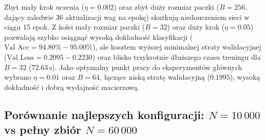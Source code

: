 \documentclass{article}
\begin{document}
\begin{table}[H]
\centering
\caption{Wpływ współczynnika uczenia (\texttt{learning\_rate}) oraz rozmiaru paczki (\texttt{batch\_size}) dla sieci \texttt{784-128-64-10} na podzbiorze $N = 10\,000$ ($15$ epok, \texttt{ReLU + CCE}).}
\label{tab:hyperparams_10k}
\vspace{0.2cm}
\end{table}

Zbyt mały krok uczenia ($\eta = 0.002$) oraz zbyt duży rozmiar paczki ($B = 256$, dający zaledwie 36 aktualizacji wag na epokę) skutkują niedouczeniem sieci w ciągu 15 epok. Z kolei mały rozmiar paczki ($B = 32$) oraz duży krok ($\eta = 0.05$) pozwalają szybko osiągnąć wysoką dokładność klasyfikacji ($\text{Val Acc} = 94.80\% - 95.00\%$), ale kosztem wyższej minimalnej straty walidacyjnej ($\text{Val Loss} = 0.2095 - 0.2230$) oraz blisko trzykrotnie dłuższego czasu treningu dla $B = 32$ ($72.63\,\text{s}$). Jako optymalny punkt pracy do eksperymentów głównych wybrano $\eta = 0.01$ oraz $B = 64$, łączące niską stratę walidacyjną ($0.1995$), wysoką dokładność i dobrą wydajność macierzową.

\subsection{Porównanie najlepszych konfiguracji: $N = 10\,000$ vs pełny zbiór $N = 60\,000$}
\label{sec:full_comparison}
\end{document}
